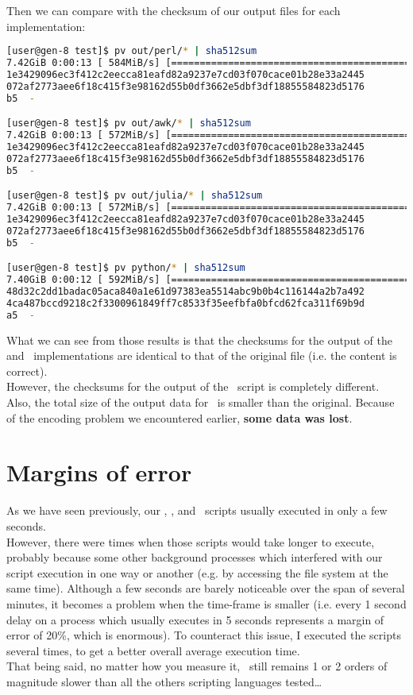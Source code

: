 \newpage
Then we can compare with the checksum of our output files for each implementation:

\begin{lstlisting}[language=sh]
[user@gen-8 test]$ pv out/perl/* | sha512sum
7.42GiB 0:00:13 [ 584MiB/s] [====================================================>] 100%
1e3429096ec3f412c2eecca81eafd82a9237e7cd03f070cace01b28e33a2445
072af2773aee6f18c415f3e98162d55b0df3662e5dbf3df18855584823d5176
b5  -

[user@gen-8 test]$ pv out/awk/* | sha512sum
7.42GiB 0:00:13 [ 572MiB/s] [====================================================>] 100%
1e3429096ec3f412c2eecca81eafd82a9237e7cd03f070cace01b28e33a2445
072af2773aee6f18c415f3e98162d55b0df3662e5dbf3df18855584823d5176
b5  -

[user@gen-8 test]$ pv out/julia/* | sha512sum
7.42GiB 0:00:13 [ 572MiB/s] [====================================================>] 100%
1e3429096ec3f412c2eecca81eafd82a9237e7cd03f070cace01b28e33a2445
072af2773aee6f18c415f3e98162d55b0df3662e5dbf3df18855584823d5176
b5  -

[user@gen-8 test]$ pv python/* | sha512sum
7.40GiB 0:00:12 [ 592MiB/s] [====================================================>] 100%
48d32c2dd1badac05aca840a1e61d97383ea5514abc9b0b4c116144a2b7a492
4ca487bccd9218c2f3300961849ff7c8533f35eefbfa0bfcd62fca311f69b9d
a5  -
\end{lstlisting}

What we can see from those results is that the checksums for the output of the \awk\, \perl\, and \julia\ implementations are identical to that of the original file (i.e. the content is correct). \\

However, the checksums for the output of the \python\ script is completely different. Also, the total size of the output data for \python\ is smaller than the original. Because of the encoding problem we encountered earlier, \textbf{some data was lost}. \\



\section*{Margins of error}

As we have seen previously, our \awk,  \perl, and \julia\ scripts usually executed in only a few seconds. \\

However, there were times when those scripts would take longer to execute, probably because some other background processes which interfered with our script execution in one way or another (e.g. by accessing the file system at the same time). Although a few seconds are barely noticeable over the span of several minutes, it becomes a problem when the time-frame is smaller (i.e. every 1 second delay on a process which usually executes in 5 seconds represents a margin of error of 20\%, which is enormous).
To counteract this issue, I executed the scripts several times, to get a better overall average execution time. \\

That being said, no matter how you measure it, \python\ still remains 1 or 2 orders of magnitude slower than all the others scripting languages tested\ldots

